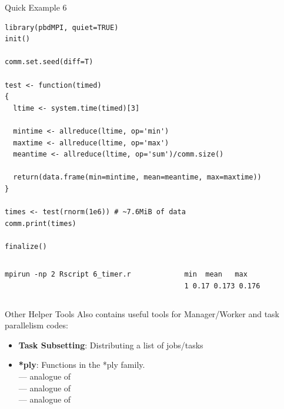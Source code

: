 \begin{frame}
  \begin{exampleblock}{Quick Example 6}
\begin{lstlisting}[title=Timing: 6\_timer.r]
library(pbdMPI, quiet=TRUE)
init()

comm.set.seed(diff=T)

test <- function(timed)
{
  ltime <- system.time(timed)[3]
  
  mintime <- allreduce(ltime, op='min')
  maxtime <- allreduce(ltime, op='max')
  meantime <- allreduce(ltime, op='sum')/comm.size()

  return(data.frame(min=mintime, mean=meantime, max=maxtime))
}

times <- test(rnorm(1e6)) # ~7.6MiB of data
comm.print(times)

finalize()
\end{lstlisting}
  \begin{columns}[t,onlytextwidth]
    \begin{column}{0.58\textwidth}
\begin{lstlisting}[backgroundcolor=\color{white},keywordstyle=\color{black},title=Execute this script via:]
mpirun -np 2 Rscript 6_timer.r
\end{lstlisting}
\end{column}
    \hfill
    \begin{column}{0.35\textwidth}
\begin{lstlisting}[title=Sample Output:]
   min  mean   max
1 0.17 0.173 0.176
\end{lstlisting}
\end{column}
\end{columns}
  \end{exampleblock}
\end{frame}



\begin{frame}
  \begin{block}{Other Helper Tools}\pause
   Also contains useful tools for Manager/Worker and task parallelism codes:
    \begin{itemize}
      \item \textbf{Task Subsetting}: Distributing a list of jobs/tasks\\ 
      \item \textbf{*ply}:  Functions in the *ply family.\\
       --- analogue of \\
       --- analogue of \\
       --- analogue of \\
    \end{itemize}
  \end{block}
\end{frame}






